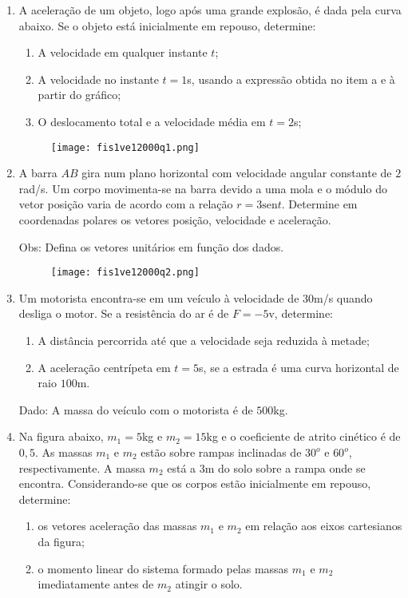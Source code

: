 \documentclass[12pt,a4paper]{article}
\newcommand{\sen}{\mathrm{sen}}
\begin{document}
\begin{enumerate}

\item A aceleração de um objeto, logo após uma grande explosão, é dada pela curva abaixo. Se o objeto está inicialmente em repouso,
determine:

\begin{enumerate}[label=\alph*)]
\item A velocidade em qualquer instante $t$;
\item A velocidade no instante $t=1$s, usando a expressão obtida no item a e à partir do gráfico;
\item O deslocamento total e a velocidade média em $t=2$s;
\end{enumerate}

\begin{figure}[ht]
\centering
\texttt{[image: fis1ve12000q1.png]}
\end{figure}

\item A barra $AB$ gira num plano horizontal com velocidade angular constante de $2$rad/s. Um corpo movimenta-se na barra
devido a uma mola e o módulo do vetor posição varia de acordo com a relação $r=3\sen{t}$. Determine em coordenadas polares os vetores
posição, velocidade e aceleração.

Obs: Defina os vetores unitários em função dos dados.

\begin{figure}[ht]
\centering
\texttt{[image: fis1ve12000q2.png]}
\end{figure}

\item Um motorista encontra-se em um veículo à velocidade de $30$m/s quando desliga o motor. Se a resistência do ar é de $F=-5$v, determine:
\begin{enumerate}[label=\alph*)]
\item A distância percorrida até que a velocidade seja reduzida à metade;
\item A aceleração centrípeta em $t=5$s, se a estrada é uma curva horizontal de raio $100$m.
\end{enumerate}

Dado: A massa do veículo com o motorista é de $500$kg.

\item Na figura abaixo, $m_1=5$kg e $m_2=15$kg e o coeficiente de atrito cinético é de $0,5$. As massas $m_1$ e $m_2$ estão sobre rampas inclinadas
de $30^o$ e $60^o$, respectivamente. A massa $m_2$ está a $3$m do solo sobre a rampa onde se encontra. Considerando-se que os corpos estão inicialmente
em repouso, determine:
\begin{enumerate}[label=\alph*)]
\item os vetores aceleração das massas $m_1$ e $m_2$ em relação aos eixos cartesianos da figura;
\item o momento linear do sistema formado pelas massas $m_1$ e $m_2$ imediatamente antes de $m_2$ atingir o solo.
\end{enumerate}


\end{enumerate}
\end{document}
